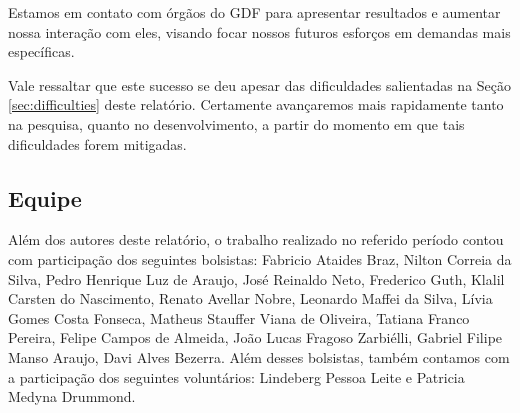 \documentclass[12pt]{article}
\begin{document}
Estamos em contato com órgãos do GDF para apresentar
resultados e aumentar nossa interação com eles, visando focar
nossos futuros esforços em demandas mais específicas.

Vale ressaltar que este sucesso se deu apesar das dificuldades salientadas na Seção \ref{sec:difficulties} deste relatório.
Certamente avançaremos mais rapidamente tanto na pesquisa, quanto
no desenvolvimento, a partir do momento em que tais dificuldades forem mitigadas.

\subsection{Equipe}
Além dos autores deste relatório, o trabalho realizado no 
referido período contou com participação dos seguintes bolsistas:
Fabricio Ataides Braz, Nilton Correia da Silva, Pedro Henrique Luz de Araujo, José Reinaldo Neto, Frederico Guth,
Klalil Carsten do Nascimento, Renato Avellar Nobre, 
Leonardo Maffei da Silva,
Lívia Gomes Costa Fonseca, Matheus Stauffer Viana de Oliveira,
Tatiana Franco Pereira,
Felipe Campos de Almeida, João Lucas Fragoso Zarbiélli,
Gabriel Filipe Manso Araujo, Davi Alves Bezerra.
Além desses bolsistas, também contamos com a participação
dos seguintes voluntários: Lindeberg Pessoa Leite
e Patricia Medyna Drummond.




\end{document}
